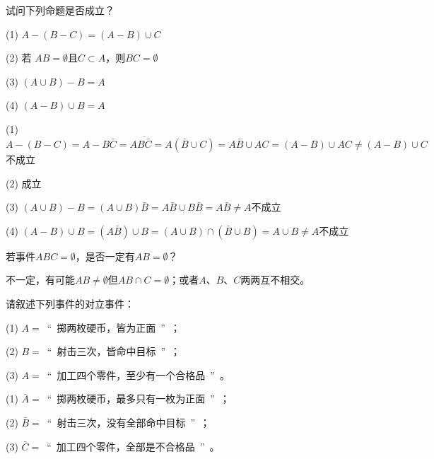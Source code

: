 \documentclass[lang=cn,newtx,10pt,scheme=chinese]{elegantbook}
\begin{document}
\begin{problemset}[习题 1.1]
    \item 试问下列命题是否成立？
    \item[(1)] $A-(B-C)=(A-B)\cup C$
    \item[(2)] 若 $AB=\emptyset$且$C \subset A$，则$BC=\emptyset$
    \item[(3)] $(A \cup B)-B=A$
    \item[(4)] $(A-B)\cup B=A$
    \begin{solution}
        \begin{framed}
            \item[(1)] $A-(B-C)=A-B\bar{C}=A\overline{B\bar{C}}=A(\bar{B}\cup C)=A\bar{B} \cup AC=(A-B) \cup AC \neq (A-B) \cup C$\quad 不成立
            \item[(2)] 成立
            \item[(3)] $(A \cup B)-B=(A \cup B)\bar{B}=A \bar{B} \cup B \bar{B} = A \bar{B} \neq A$\quad 不成立
            \item[(4)] $(A-B)\cup B=(A \bar{B}) \cup B = (A \cup B) \cap (\bar{B} \cup B)=A \cup B \neq A$\quad 不成立
        \end{framed}
    \end{solution}

    \item 若事件$ABC=\emptyset$，是否一定有$AB=\emptyset$？
    \begin{solution}
        \begin{framed}
            不一定，有可能$AB \neq \emptyset$但$AB \cap C = \emptyset$；或者$A、B、C$两两互不相交。
        \end{framed}
    \end{solution}
    \newpage

    \item 请叙述下列事件的对立事件：
    \item[(1)] $A=$\ ``\ 掷两枚硬币，皆为正面\ ''\ ；
    \item[(2)] $B=$\ ``\ 射击三次，皆命中目标\ ''\ ；
    \item[(3)] $A=$\ ``\ 加工四个零件，至少有一个合格品\ ''\ 。
    \begin{solution}
        \begin{framed}
            \item[(1)] $\bar A=$\ ``\ 掷两枚硬币，最多只有一枚为正面\ ''\ ；
            \item[(2)] $\bar B=$\ ``\ 射击三次，没有全部命中目标\ ''\ ；
            \item[(3)] $\bar C=$\ ``\ 加工四个零件，全部是不合格品\ ''\ 。
        \end{framed}
    \end{solution}


\end{problemset}
\end{document}
